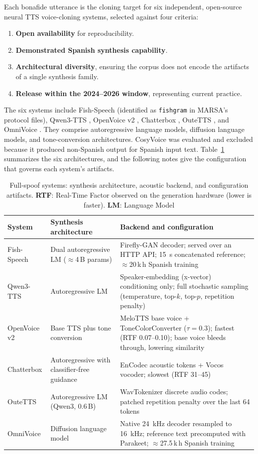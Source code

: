 \documentclass[11pt]{report}
\begin{document}
Each bonafide utterance is the cloning target for six independent,
open-source neural TTS voice-cloning systems, selected against four
criteria:
\begin{enumerate}
  \item \textbf{Open availability} for reproducibility.
  \item \textbf{Demonstrated Spanish synthesis capability}.
  \item \textbf{Architectural diversity}, ensuring the corpus does not
  encode the artifacts of a single synthesis family.
  \item \textbf{Release within the 2024--2026 window}, representing
  current practice.
\end{enumerate}
The six systems include Fish-Speech \citep{fishspeech} (identified as
\texttt{fishgram} in MARSA's protocol files), Qwen3-TTS
\citep{qwen3tts}, OpenVoice v2 \citep{openvoice}, Chatterbox
\citep{chatterbox}, OuteTTS \citep{outetts}, and OmniVoice
\citep{omnivoice}. They comprise autoregressive language models,
diffusion language models, and tone-conversion architectures. CosyVoice
\citep{cosyvoice} was evaluated and excluded because it produced
non-Spanish output for Spanish input text. Table~\ref{tab:systems}
summarizes the six architectures, and the following notes give the
configuration that governs each system's artifacts.

\begin{table}[H]
\centering
\caption{Full-spoof systems: synthesis architecture, acoustic backend,
and configuration artifacts. \textbf{RTF}: Real-Time Factor observed on the generation hardware (lower is faster). \textbf{LM}: Language Model}
\label{tab:systems}
\small
\begin{tabular}{p{2.1cm}p{3.5cm}p{7cm}}
\toprule
\textbf{System} & \textbf{Synthesis architecture} & \textbf{Backend and configuration} \\
\midrule
Fish-Speech & Dual autoregressive LM ($\approx$4\,B params) & Firefly-GAN decoder; served over an HTTP API; \SI{15}{\second} concatenated reference; $\approx$20\,k\,h Spanish training \\
Qwen3-TTS & Autoregressive LM & Speaker-embedding (x-vector) conditioning only; full stochastic sampling (temperature, top-$k$, top-$p$, repetition penalty) \\
OpenVoice v2 & Base TTS plus tone conversion & MeloTTS base voice + ToneColorConverter ($\tau=0.3$); fastest (RTF 0.07--0.10); base voice bleeds through, lowering similarity \\
Chatterbox & Autoregressive with classifier-free guidance & EnCodec acoustic tokens + Vocos vocoder; slowest (RTF 31--45) \\
OuteTTS & Autoregressive LM (Qwen3, 0.6\,B) & WavTokenizer discrete audio codes; patched repetition penalty over the last 64 tokens \\
OmniVoice & Diffusion language model & Native \SI{24}{\kilo\hertz} decoder resampled to \SI{16}{\kilo\hertz}; reference text precomputed with Parakeet; $\approx$27.5\,k\,h Spanish training \\
\bottomrule
\end{tabular}
\end{table}
\end{document}
